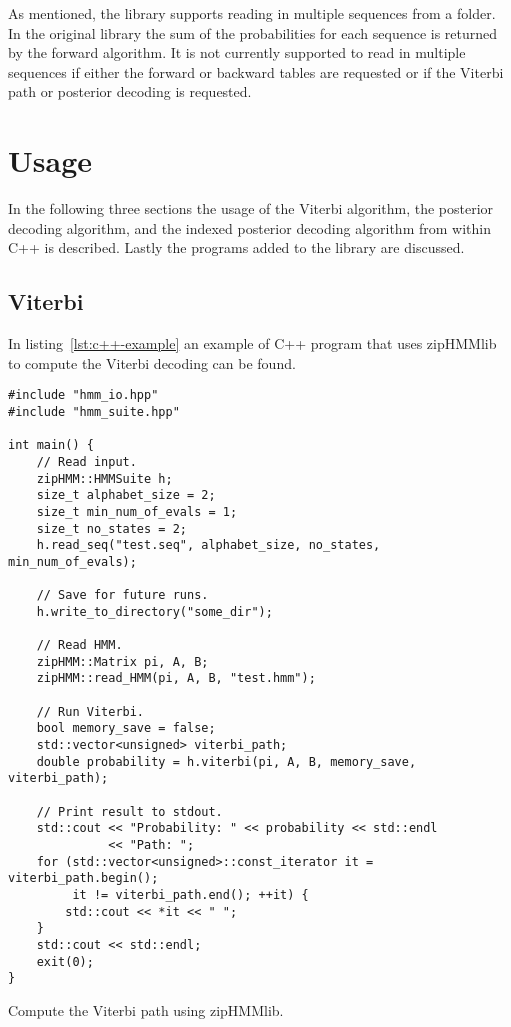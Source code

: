 As mentioned, the library supports reading in multiple sequences from a folder. In the
original library the sum of the probabilities for each sequence is returned by
the forward algorithm. It is not currently supported to read in multiple
sequences if either the forward or backward tables are requested or if
the Viterbi path or posterior decoding is requested.

\section{Usage}

In the following three sections the usage of the Viterbi algorithm, the
posterior decoding algorithm, and the indexed posterior decoding algorithm from
within C++ is described. Lastly the programs added to the library are
discussed.

\subsection{Viterbi}

In listing~\ref{lst:c++-example} an example of C++ program that uses zipHMMlib
to compute the Viterbi decoding can be found.

\begin{listing}
\begin{verbatim}
#include "hmm_io.hpp"
#include "hmm_suite.hpp"

int main() {
    // Read input.
    zipHMM::HMMSuite h;
    size_t alphabet_size = 2;
    size_t min_num_of_evals = 1;
    size_t no_states = 2;
    h.read_seq("test.seq", alphabet_size, no_states, min_num_of_evals);

    // Save for future runs.
    h.write_to_directory("some_dir");

    // Read HMM.
    zipHMM::Matrix pi, A, B;
    zipHMM::read_HMM(pi, A, B, "test.hmm");

    // Run Viterbi.
    bool memory_save = false;
    std::vector<unsigned> viterbi_path;
    double probability = h.viterbi(pi, A, B, memory_save, viterbi_path);

    // Print result to stdout.
    std::cout << "Probability: " << probability << std::endl
              << "Path: ";
    for (std::vector<unsigned>::const_iterator it = viterbi_path.begin();
         it != viterbi_path.end(); ++it) {
        std::cout << *it << " ";
    }
    std::cout << std::endl;
    exit(0);
}
\end{verbatim}
\caption{Compute the Viterbi path using zipHMMlib.}
\label{lst:c++-example}
\end{listing}

